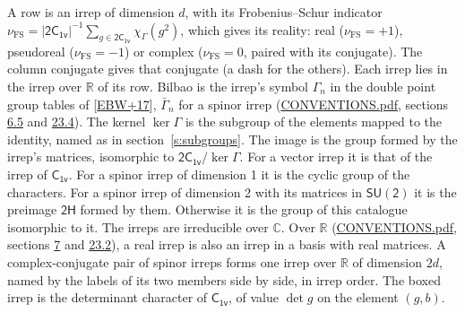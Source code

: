 \documentclass[10pt,a4paper]{article}
\numberwithin{equation}{section}
\newcommand{\grp}[1]{\mathsf{#1}}
\newcommand{\irchar}[1]{\chi_{#1}}
\newcommand{\fsind}{\nu_{\mathrm{FS}}}
\begin{document}
\leavevmode\label{n:index.frobenius}\label{n:head.irrep}\label{n:head.reality}A row is an irrep of dimension $d$, with its Frobenius--Schur indicator $\fsind = |\grp{2C_{1v}}|^{-1}\allowbreak\sum_{g\in\grp{2C_{1v}}}\irchar{\Gamma}(g^2)$, which gives its reality: real ($\fsind = +1$), pseudoreal ($\fsind = -1$) or complex ($\fsind = 0$, paired with its conjugate). \label{n:head.conjugate}The column conjugate gives that conjugate (a dash for the others). \label{n:head.over.real}Each irrep lies in the irrep over $\mathbb{R}$ of its row. \label{n:head.bilbao}\label{n:irrep.alias.gamma}Bilbao is the irrep's symbol $\Gamma_n$ in the double point group tables of [\href{../../../REFERENCES.pdf\#ref.EBW+17}{EBW+17}], $\bar{\Gamma}_n$ for a spinor irrep (\href{../../CONVENTIONS.pdf}{CONVENTIONS.pdf}, sections \href{../../../rotation/CONVENTIONS.pdf\#conv.6.5}{6.5} and \href{../../CONVENTIONS.pdf\#conv.23.4}{23.4}). \label{n:head.kernel}The kernel $\ker\Gamma$ is the subgroup of the elements mapped to the identity, named as in section~\ref{s:subgroups}. \label{n:head.image}The image is the group formed by the irrep's matrices, isomorphic to $\grp{2C_{1v}}/\ker\Gamma$. For a vector irrep it is that of the irrep of \href{../../../rotation/data/pdf/C1v.pdf}{$\grp{C_{1v}}$}. For a spinor irrep of dimension 1 it is the cyclic group of the characters. For a spinor irrep of dimension 2 with its matrices in $\grp{SU(2)}$ it is the preimage $\grp{2H}$ formed by them. Otherwise it is the group of this catalogue isomorphic to it. The irreps are irreducible over $\mathbb{C}$. Over $\mathbb{R}$ (\href{../../CONVENTIONS.pdf}{CONVENTIONS.pdf}, sections \href{../../../rotation/CONVENTIONS.pdf\#conv.7}{7} and \href{../../CONVENTIONS.pdf\#conv.23.2}{23.2}), a real irrep is also an irrep in a basis with real matrices. A complex-conjugate pair of spinor irreps forms one irrep over $\mathbb{R}$ of dimension $2d$, named by the labels of its two members side by side, in irrep order. \label{n:mark.determinant}The boxed irrep is the determinant character of \href{../../../rotation/data/pdf/C1v.pdf}{$\grp{C_{1v}}$}, of value $\det g$ on the element $(g, b)$.
\setlength{\emergencystretch}{2em}\par\setlength{\emergencystretch}{0pt}
\end{document}
